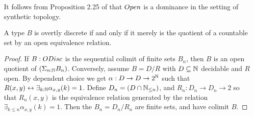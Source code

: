 \begin{remark}\label{OpenDominance}
  It follows from  Proposition 2.25 of \cite{SyntheticTopologyLesnik} that 
  $\Open$ is a dominance in the setting of synthetic topology. 
\end{remark}

\begin{lemma}\label{OdiscQuotientCountableByOpen}\label{ODiscEqualityOpen}
  A type $B$ is overtly discrete if and only if it merely is the quotient of a countable set by an open equivalence relation. 
\end{lemma}
\begin{proof}
  If $B:\ODisc$ is the sequential colimit of finite sets $B_n$, 
  then $B$ is an open quotient of $ (\Sigma_{n:\mathbb{N}} B_n)$.
%
  Conversely, assume $B= D/R$ with $D\subseteq \mathbb{N}$ decidable and $R$ open. 
  By dependent choice we get $\alpha:D \to D \to 2^{\mathbb{N}}$ such that 
  $R(x,y)\leftrightarrow \exists_{k:\mathbb{N}}\alpha_{x,y}(k) = 1$. 
  Define $D_n = (D \cap \mathbb{N}_{\leq n})$, and $R_n : D_n \to D_n \to 2$ so that 
  $R_n(x,y)$ is the equivalence relation generated by the relation 
  $\exists_{k\leq n} \alpha_{x,y}(k) =1$. 
  Then the $B_n = D_n/R_n$ are finite sets, and have colimit $B$. 
\end{proof}

